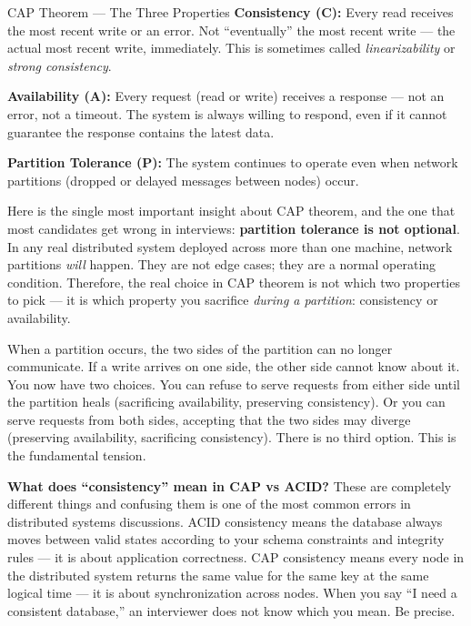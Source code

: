 \documentclass[11pt,a4paper]{article}
\begin{document}
\begin{termbox}{CAP Theorem --- The Three Properties}
\textbf{Consistency (C):} Every read receives the most recent write or an error. Not ``eventually'' the most recent write --- the actual most recent write, immediately. This is sometimes called \textit{linearizability} or \textit{strong consistency}.

\textbf{Availability (A):} Every request (read or write) receives a response --- not an error, not a timeout. The system is always willing to respond, even if it cannot guarantee the response contains the latest data.

\textbf{Partition Tolerance (P):} The system continues to operate even when network partitions (dropped or delayed messages between nodes) occur.
\end{termbox}

Here is the single most important insight about CAP theorem, and the one that most candidates get wrong in interviews: \textbf{partition tolerance is not optional}. In any real distributed system deployed across more than one machine, network partitions \textit{will} happen. They are not edge cases; they are a normal operating condition. Therefore, the real choice in CAP theorem is not which two properties to pick --- it is which property you sacrifice \textit{during a partition}: consistency or availability.

When a partition occurs, the two sides of the partition can no longer communicate. If a write arrives on one side, the other side cannot know about it. You now have two choices. You can refuse to serve requests from either side until the partition heals (sacrificing availability, preserving consistency). Or you can serve requests from both sides, accepting that the two sides may diverge (preserving availability, sacrificing consistency). There is no third option. This is the fundamental tension.

\begin{thinkbox}
\textbf{What does ``consistency'' mean in CAP vs ACID?} These are completely different things and confusing them is one of the most common errors in distributed systems discussions. ACID consistency means the database always moves between valid states according to your schema constraints and integrity rules --- it is about application correctness. CAP consistency means every node in the distributed system returns the same value for the same key at the same logical time --- it is about synchronization across nodes. When you say ``I need a consistent database,'' an interviewer does not know which you mean. Be precise.
\end{thinkbox}
\end{document}
